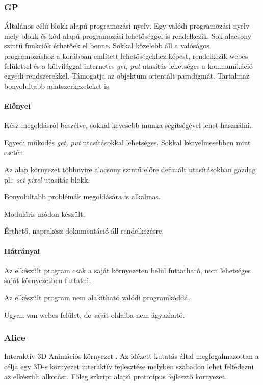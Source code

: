 \documentclass[12pt,a4paper,oneside]{report} %
\begin{document}
\subsubsection{GP} Általános célú blokk alapú \cite{ohshima2015module} \cite{monig2015blocks} programozási nyelv. Egy valódi programozási nyelv mely blokk és kód alapú programozási lehetőséggel is rendelkezik.  Sok alacsony szintű funkciók érhetőek el benne. Sokkal közelebb áll a valóságos programozáshoz a korábban említett lehetőségekhez képest, rendelkezik webes felülettel és a külvilággal internetes \textit{get}, \textit{put} utasítás lehetséges a kommunikáció egyedi rendszerekkel. Támogatja az objektum orientált paradigmát. Tartalmaz bonyolultabb adatszerkezeteket is.
\paragraph{Előnyei} 
\begin{compactitem}
	\item Kész megoldásról beszélve, sokkal kevesebb munka segítségével lehet használni.
	\item Egyedi működés \textit{get, put} utasításokkal lehetséges. \newline Sokkal kényelmesebben mint  esetén.
	\item Az alap környezet többnyire alacsony szintű előre definiált utasításokban gazdag pl.: \textit{set pixel} utasítás blokk.
	\item Bonyolultabb problémák megoldására is alkalmas.
	\item Moduláris módon készült.
	\item Érthető, naprakész dokumentáció áll rendelkezésre.
\end{compactitem}
\paragraph{Hátrányai} 
\begin{compactitem}
	\item Az elkészült program csak a saját környezeten belül futtatható, nem lehetséges saját környezetben futtatni.
	\item Az elkészült program nem alakítható valódi programkóddá.
	\item Ugyan van webes felület, de saját oldalba nem ágyazható.
\end{compactitem}

\subsubsection{Alice} Interaktív 3D Animációs környezet \cite{cooper2000alice}. Az idézett kutatás által megfogalmazottan a  célja egy 3D-s környezet interaktív fejlesztése melyben szabadon lehet felfedezni az elkészült alkotást. Főleg szkript alapú prototípus fejlesztő környezet. 
\end{document}

